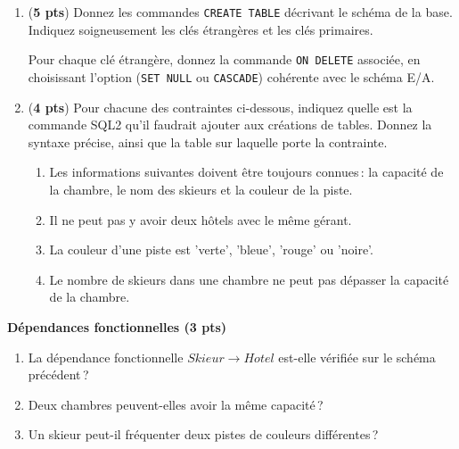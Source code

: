 \documentclass{article}
\begin{document}
\begin{enumerate}
   \item ({\bf 5 pts}) Donnez les commandes {\tt CREATE TABLE} d\'ecrivant
         le sch\'ema de la base. Indiquez soigneusement
         les cl\'es \'etrang\`eres et les cl\'es primaires.

         Pour chaque cl\'e \'etrang\`ere, donnez la
        commande {\tt ON DELETE} associ\'ee, en choisissant
        l'option ({\tt SET NULL} ou {\tt CASCADE})
        coh\'erente avec le sch\'ema E/A.

   \item ({\bf 4 pts})
       Pour chacune des contraintes ci-dessous, indiquez
        quelle est la commande SQL2 qu'il faudrait ajouter
        aux cr\'eations de tables. Donnez la syntaxe pr\'ecise,
       ainsi que la table sur
    laquelle porte la contrainte.

   \begin{enumerate}
       \item Les informations suivantes doivent \^etre
        toujours connues\,: la capacit\'e 
          de la chambre, le nom des skieurs
          et la couleur de la piste.
   
       \item Il ne peut pas y avoir deux h\^otels avec le 
             m\^eme g\'erant.
      
       \item La couleur d'une piste est 'verte', 'bleue', 
                'rouge' ou 'noire'.

       \item Le nombre de skieurs dans une chambre ne peut
                 pas d\'epasser la capacit\'e de la chambre.       
   \end{enumerate}
\end{enumerate}
    

\smallskip
{\bf D\'ependances fonctionnelles (3 pts)}


\begin{enumerate}
   \item La d\'ependance fonctionnelle $Skieur \to Hotel$ 
       est-elle v\'erifi\'ee sur le sch\'ema pr\'ec\'edent\,?

    \item Deux chambres peuvent-elles avoir la m\^eme capacit\'e\,?

    \item Un skieur peut-il fr\'equenter deux pistes de couleurs
           diff\'erentes\,?
\end{enumerate}
\end{document}
